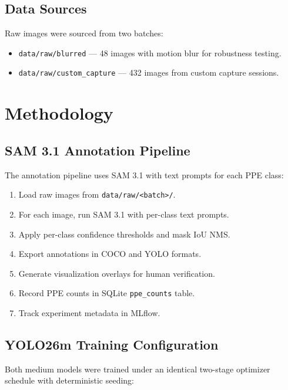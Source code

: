 \documentclass[a4paper,11pt]{article}
\begin{document}
\subsection{Data Sources}

Raw images were sourced from two batches:
\begin{itemize}[leftmargin=2cm, itemsep=2pt]
  \item \texttt{data/raw/blurred} --- 48 images with motion blur for robustness testing.
  \item \texttt{data/raw/custom\_capture} --- 432 images from custom capture sessions.
\end{itemize}

\section{Methodology}

\subsection{SAM 3.1 Annotation Pipeline}

The annotation pipeline uses SAM 3.1 with text prompts for each PPE class:
\begin{enumerate}[leftmargin=2cm, itemsep=2pt]
  \item Load raw images from \texttt{data/raw/<batch>/}.
  \item For each image, run SAM 3.1 with per-class text prompts.
  \item Apply per-class confidence thresholds and mask IoU NMS.
  \item Export annotations in COCO and YOLO formats.
  \item Generate visualization overlays for human verification.
  \item Record PPE counts in SQLite \texttt{ppe\_counts} table.
  \item Track experiment metadata in MLflow.
\end{enumerate}

\subsection{YOLO26m Training Configuration}

Both medium models were trained under an identical two-stage optimizer schedule with deterministic seeding:
\end{document}
